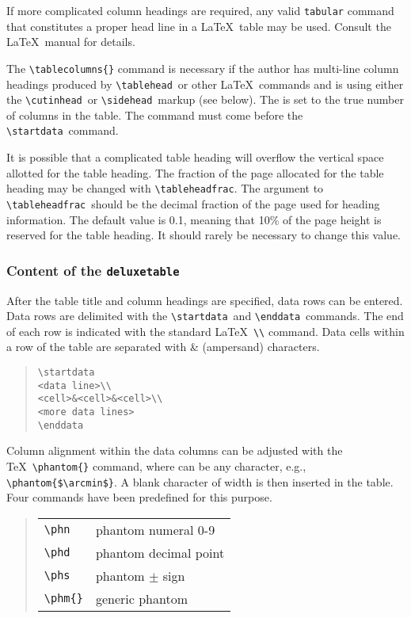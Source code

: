 \documentclass[preprint2]{aastex}
\begin{document}
If more complicated column headings are required, 
any valid \texttt{tabular} command that constitutes a proper 
head line in a \LaTeX\ table may be used. 
Consult the \LaTeX\ manual \citep{Lamport} for details. 
 
The \verb"\tablecolumns{"\verb"}" command 
is necessary if the author has 
multi-line column headings produced by \verb"\tablehead"\ 
 or other \LaTeX\ 
commands and is using either the \verb"\cutinhead"\ 
 or \verb"\sidehead"\ 
markup (see below).  The  is 
set to the true number of columns in the 
table.  The command must come before the \verb"\startdata"\ 
 command. 
 
It is possible that a complicated table heading will overflow 
the vertical space allotted for the table heading. 
The fraction of the page allocated 
for the table heading may be changed with \verb"\tableheadfrac". 
The  argument to \verb"\tableheadfrac"\ 
 should be the 
decimal fraction of the page used for heading information. 
The default value is 0.1, meaning that 10\% of the page height 
is reserved for the table heading.  It should rarely be necessary 
to change this value. 
 
\subsubsection{Content of the {\tt deluxetable}} 
 
After the table title and column headings are specified, 
data rows can be entered. 
Data rows are delimited with the \verb"\startdata"\ 
 and \verb"\enddata"\ 
 commands. 
The end of each row is indicated with the standard \LaTeX\ \verb"\\" command. 
Data cells within a row of the table are separated with \& (ampersand) characters. 
\begin{quote} 
\begin{verbatim} 
\startdata 
<data line>\\ 
<cell>&<cell>&<cell>\\ 
<more data lines> 
\enddata 
\end{verbatim} 
\end{quote} 
 
Column alignment within the data columns can be adjusted with the \TeX\ 
\verb"\phantom{"\verb"}" command, 
where  can be any character, e.g., \verb"\phantom{$\arcmin$}". 
A blank character of width  is then inserted in the table. 
Four commands have been predefined for this purpose. 
\begin{quote} 
\begin{tabular}{l@{\quad}p{2in}} 
{\verb"\phn"%
} & {phantom numeral 0-9}\\ 
{\verb"\phd"%
} & {phantom decimal point}\\ 
{\verb"\phs"%
} & {phantom $\pm$ sign}\\ 
{\verb"\phm{"\m{string}\verb"}"} & {generic phantom}\\ 
\end{tabular} 
\end{quote} 
 
\end{document}
